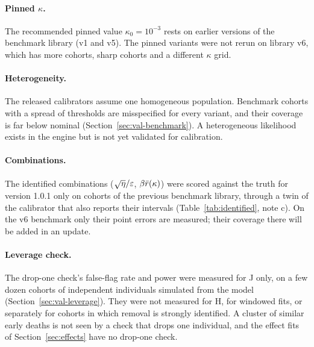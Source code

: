 \paragraph{Pinned $\kappa$.} The recommended pinned value $\kappa_0=10^{-3}$ rests on earlier versions of the
benchmark library (v1 and v5). The pinned variants were not rerun on library v6, which has more cohorts, sharp cohorts
and a different $\kappa$ grid.

\paragraph{Heterogeneity.} The released calibrators assume one homogeneous population. Benchmark cohorts with a
spread of thresholds are misspecified for every variant, and their coverage is far below nominal
(Section~\ref{sec:val-benchmark}). A heterogeneous likelihood exists in the engine but is not yet validated for
calibration.

\paragraph{Combinations.} The identified combinations ($\sqrt\eta/\varepsilon$, $\beta\bar r(\kappa)$) were scored against the
truth for version 1.0.1 only on  cohorts of the previous benchmark library, through a twin of the
calibrator that also reports their intervals (Table~\ref{tab:identified}, note c). On the v6 benchmark only their
point errors are measured; their coverage there will be added in an update.

\paragraph{Leverage check.} The drop-one check's false-flag rate and power were measured for J only, on a few dozen
cohorts of independent individuals simulated from the model (Section~\ref{sec:val-leverage}). They were not measured
for H, for windowed fits, or separately for cohorts in which removal is strongly identified. A cluster of similar early
deaths is not seen by a check that drops one individual, and the effect fits of Section~\ref{sec:effects} have no
drop-one check.



